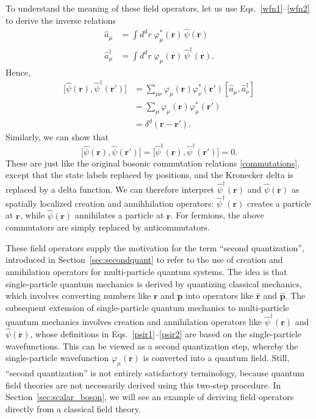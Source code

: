 \documentclass[prx,12pt]{revtex4-2}
\begin{document}
To understand the meaning of these field operators, let us use
Eqs.~\eqref{wfn1}--\eqref{wfn2} to derive the inverse relations
\begin{align}
  \hat{a}_\mu &= \int d^dr \; \varphi_\mu^*(\mathbf{r}) \, \hat{\psi}(\mathbf{r}) \\
  \hat{a}_\mu^\dagger &= \int d^dr \; \varphi_\mu(\mathbf{r}) \, \hat{\psi}^\dagger(\mathbf{r}).
\end{align}
Hence,
\begin{align}
  \big[\hat{\psi}(\mathbf{r}), \hat{\psi}^\dagger(\mathbf{r}')\big]
  &= \sum_{\mu\nu} \varphi_\mu(\mathbf{r}) \varphi_\nu^*(\mathbf{r}')
  \left[\hat{a}_\mu, \hat{a}_\nu^\dagger\right] \\
  &= \sum_{\mu} \varphi_\mu(\mathbf{r}) \varphi_\mu^*(\mathbf{r}') \\
  &= \delta^d(\mathbf{r}-\mathbf{r}').
\end{align}
Similarly, we can show that
\begin{equation}
  \big[\hat{\psi}(\mathbf{r}), \hat{\psi}(\mathbf{r}')\big]
  = \big[\hat{\psi}^\dagger(\mathbf{r}), \hat{\psi}^\dagger(\mathbf{r}')\big]
  = 0.
\end{equation}
These are just like the original bosonic commutation relations
\eqref{commutations}, except that the state labels replaced by
positions, and the Kronecker delta is replaced by a delta function.
We can therefore interpret $\hat{\psi}^\dagger(\mathbf{r})$ and
$\hat{\psi}(\mathbf{r})$ as spatially localized creation and
annihhilation operators: $\hat{\psi}^\dagger(\mathbf{r})$ creates a
particle at $\mathbf{r}$, while $\hat{\psi}(\mathbf{r})$ annihilates a
particle at $\mathbf{r}$.  For fermions, the above commutators are
simply replaced by anticommutators.

\label{second_quantization_terminology}
These field operators supply the motivation for the term ``second
quantization'', introduced in Section~\ref{sec:secondquant} to refer
to the use of creation and annihilation operators for multi-particle
quantum systems.  The idea is that single-particle quantum mechanics
is derived by quantizing classical mechanics, which involves
converting numbers like $\mathbf{r}$ and $\mathbf{p}$ into operators
like $\hat{\mathbf{r}}$ and $\hat{\mathbf{p}}$.  The subsequent
extension of single-particle quantum mechanics to multi-particle
quantum mechanics involves creation and annihilation operators like
$\hat{\psi}^\dagger(\mathbf{r})$ and $\hat{\psi}(\mathbf{r})$, whose
definitions in Eqs.~\eqref{psir1}--\eqref{psir2} are based on the
single-particle wavefunctions.  This can be viewed as a second
quantization step, whereby the single-particle wavefunction
$\varphi_\mu(\mathbf{r})$ is converted into a quantum field.  Still,
``second quantization'' is not entirely satisfactory terminology,
because quantum field theories are not necessarily derived using this
two-step procedure.  In Section~\ref{sec:scalar_boson}, we will see an
example of deriving field operators directly from a classical field
theory.
\end{document}
